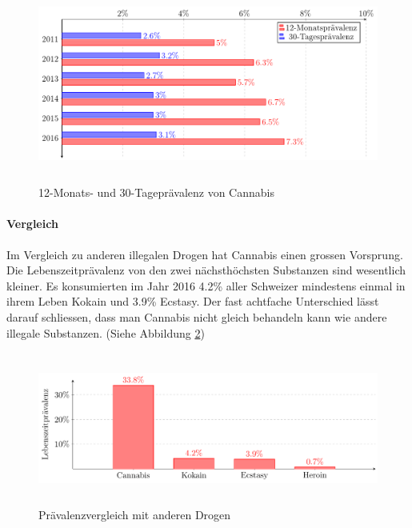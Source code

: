 \documentclass[../main.tex]{subfiles}
\begin{document}
	\noindent	 
	\begin{figure}[H]
		\centering
		\includegraphics[height=6.5cm]{../figures/druguse-shorttime}
		\captionsetup{font=small}
		\caption[12-Monats- und 30-Tageprävalenz von Cannabis]{12-Monats- und 30-Tageprävalenz von Cannabis\protect\footnotemark}	
		\label{fig:kurzzeitpravalenz}	
	\end{figure}
	
	\paragraph{Vergleich}
	Im Vergleich zu anderen illegalen Drogen hat Cannabis einen grossen Vorsprung.
	Die Lebenszeitprävalenz von den zwei nächsthöchsten Substanzen sind wesentlich kleiner.
	Es konsumierten im Jahr 2016 4.2\% aller Schweizer mindestens einmal in ihrem Leben Kokain und 3.9\% Ecstasy.
	Der fast achtfache Unterschied lässt darauf schliessen, dass man Cannabis nicht gleich behandeln kann wie andere illegale Substanzen. 
	(Siehe Abbildung \ref{fig:otherdrugs})
	
	\noindent
	\begin{figure}[H]
		\centering
		\includegraphics[height=5cm]{../figures/druguse-other}
		\captionsetup{font=small, skip=0pt}
		\caption[Prävalenzvergleich mit anderen Drogen]{Prävalenzvergleich mit anderen Drogen\protect\footnotemark}		
		\label{fig:otherdrugs}
	\end{figure}
	
\end{document}
